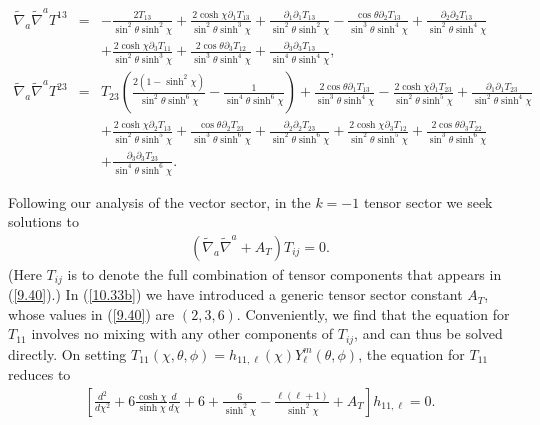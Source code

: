 \documentclass[aps,onecolumn,10pt]{revtex4}
\numberwithin{equation}{section}
\numberwithin{equation}{section}
\begin{document}
\begin{eqnarray}
 \nonumber\\ 
\tilde{\nabla}_a\tilde{\nabla}^aT^{13}&=& - \frac{2 T_{13}}{\sin^2\theta \sinh^2\chi} + \frac{2 \cosh\chi \partial_{1}T_{13}}{\sin^2\theta \sinh^3\chi} + \frac{\partial_{1}\partial_{1}T_{13}}{\sin^2\theta \sinh^2\chi} -  \frac{\cos\theta \partial_{2}T_{13}}{\sin^3\theta \sinh^4\chi} + \frac{\partial_{2}\partial_{2}T_{13}}{\sin^2\theta \sinh^4\chi} \nonumber \\ 
&& + \frac{2 \cosh\chi \partial_{3}T_{11}}{\sin^2\theta \sinh^3\chi} + \frac{2 \cos\theta \partial_{3}T_{12}}{\sin^3\theta \sinh^4\chi} + \frac{\partial_{3}\partial_{3}T_{13}}{\sin^4\theta \sinh^4\chi},
 \nonumber\\ 
\tilde{\nabla}_a\tilde{\nabla}^aT^{23}&=& T_{23} \left(\frac{2(1-\sinh^2\chi)}{\sin^2\theta\sinh^6\chi} -  \frac{1}{\sin^4\theta \sinh^6\chi}\right) + \frac{2 \cos\theta \partial_{1}T_{13}}{\sin^3\theta \sinh^4\chi} -  \frac{2 \cosh\chi \partial_{1}T_{23}}{\sin^2\theta \sinh^5\chi} + \frac{\partial_{1}\partial_{1}T_{23}}{\sin^2\theta \sinh^4\chi}\nonumber \\ 
&& + \frac{2 \cosh\chi \partial_{2}T_{13}}{\sin^2\theta \sinh^5\chi} + \frac{\cos\theta \partial_{2}T_{23}}{\sin^3\theta \sinh^6\chi} + \frac{\partial_{2}\partial_{2}T_{23}}{\sin^2\theta \sinh^6\chi} + \frac{2 \cosh\chi \partial_{3}T_{12}}{\sin^2\theta \sinh^5\chi} + \frac{2 \cos\theta \partial_{3}T_{22}}{\sin^3\theta \sinh^6\chi} 
\nonumber \\ 
&& + \frac{\partial_{3}\partial_{3}T_{23}}{\sin^4\theta \sinh^6\chi}.
\label{10.32b}
\end{eqnarray}
%

Following our analysis of the vector sector, in the $k=-1$ tensor sector we seek solutions to
%
\begin{eqnarray}
(\tilde{\nabla}_a\tilde{\nabla}^a+A_T)T_{ij}=0.
\label{10.33b}
\end{eqnarray}
%
(Here $T_{ij}$ is to denote the full combination of  tensor components that appears in (\ref{9.40}).)  In (\ref{10.33b}) we have introduced a generic tensor sector constant $A_T$, whose values in (\ref{9.40})  are $(2,3,6)$.
Conveniently, we find that the equation for $T_{11}$ involves no mixing with any other components of $T_{ij}$, and can thus be solved directly. On setting $T_{11}(\chi,\theta,\phi)=h_{11,\ell}(\chi)Y_{\ell}^m(\theta,\phi)$, the equation for $T_{11}$ reduces to 
%
\begin{eqnarray}
\left[\frac{d^2}{d\chi^2}+6\frac{\cosh\chi}{ \sinh\chi}\frac{d }{d\chi}
+6+\frac{6 }{ \sinh^2\chi}-\frac{\ell(\ell+1)}{ \sinh^2\chi}+A_T\right]h_{11,\ell}=0.
\label{10.34b}
\end{eqnarray}
%
\end{document}

